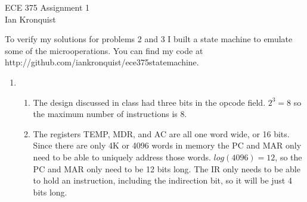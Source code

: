 \documentclass[12pt,letterpaper]{article}
\begin{document}
\begin{flushright}
{\large
ECE 375 Assignment 1\\
Ian Kronquist
}
\end{flushright}

To verify my solutions for problems 2 and 3 I built a state machine to emulate
some of the microoperations. You can find my code at
http://github.com/iankronquist/ece375statemachine.

\bigskip

\begin{enumerate}
    \item 
    \begin{enumerate}
        \item The design discussed in class had three bits in the opcode field.
        $2^3 = 8$ so the maximum number of instructions is 8.
        \item The registers TEMP, MDR, and AC are all one word wide, or 16
        bits. Since there are only 4K or 4096 words in memory the PC and MAR
        only need to be able to uniquely address those words. $log(4096) = 12$,
        so the PC and MAR only need to be 12 bits long.  The IR only needs to
        be able to hold an instruction, including the indirection bit, so it
        will be just 4 bits long.
    \end{enumerate}


\end{enumerate}
\end{document}
